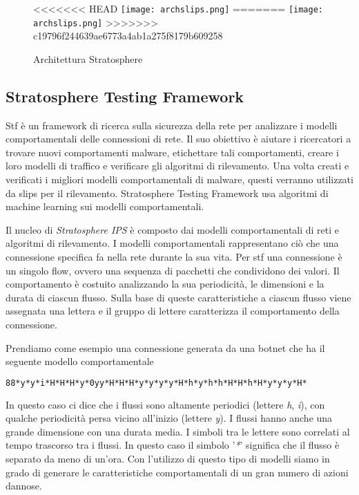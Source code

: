 \documentclass[../main.tex]{subfiles}
\begin{document}
\begin{figure}[H]
\centering
<<<<<<< HEAD
\texttt{[image: archslips.png]}
=======
\texttt{[image: archslips.png]}
>>>>>>> c19796f244639ae6773a4ab1a275f8179b609258
\caption{Architettura Stratosphere}
\label{fig:architetturaStratosphere}
\end{figure}



\subsection{Stratosphere Testing Framework}
Stf è un framework di ricerca sulla sicurezza della rete per analizzare i modelli comportamentali delle connessioni di rete. Il suo obiettivo è aiutare i ricercatori a trovare nuovi comportamenti malware, etichettare tali comportamenti, creare i loro modelli di traffico e verificare gli algoritmi di rilevamento. Una volta creati e verificati i migliori modelli comportamentali di malware, questi verranno utilizzati da slips per il rilevamento. Stratosphere Testing Framework usa algoritmi di machine learning sui modelli comportamentali.

Il nucleo di \textit{Stratosphere IPS} è composto dai modelli comportamentali di reti e algoritmi di rilevamento. I modelli comportamentali rappresentano ciò che una connessione specifica fa nella rete durante la sua vita. Per stf una connessione è un singolo flow, ovvero una sequenza di pacchetti che condividono dei valori. Il comportamento è costuito analizzando la sua periodicità, le dimensioni e la durata di ciascun flusso. Sulla base di queste caratteristiche a ciascun flusso viene assegnata una lettera e il gruppo di lettere caratterizza il comportamento della connessione.

Prendiamo come esempio una connessione generata da una botnet che ha il seguente modello comportamentale
\begin{lstlisting}[language=bash]
88*y*y*i*H*H*H*y*0yy*H*H*H*y*y*y*y*H*h*y*h*h*H*H*h*H*y*y*y*H*
\end{lstlisting}

In questo caso ci dice che i flussi sono altamente periodici (lettere \textit{h}, \textit{i}), con qualche periodicità persa vicino all'inizio (lettere \textit{y}). I flussi hanno anche una grande dimensione con una durata media. I simboli tra le lettere sono correlati al tempo trascorso tra i flussi. In questo caso il simbolo '\textit{*}' significa che il flusso è separato da meno di un'ora.
Con l'utilizzo di questo tipo di modelli siamo in grado di generare le caratteristiche comportamentali di un gran numero di azioni dannose. 
\end{document}
